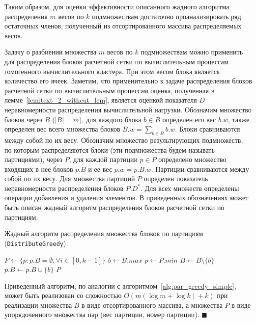 Таким образом, для оценки эффективности описанного жадного алгоритма распределения $m$ весов по $k$ подмножествам достаточно проанализировать ряд остаточных членов, полученный из отсортированного массива распределяемых весов.

Задачу о разбиении множества $m$ весов по $k$ подмножествам можно применить для распределения блоков расчетной сетки по вычислительным процессам гомогенного вычислительного кластера.
При этом весом блока является количество его ячеек.
Заметим, что применительно к задаче распределения блоков расчетной сетки по вычислительным процессам оценка, полученная в лемме~\ref{lem:text_2_withcut_lem}, является оценкой показателя $D$ неравномерности распределения вычислительной нагрузки.
Обозначим множество блоков через $B$ ($|B| = m$), для каждого блока $b \in B$ определен его вес $b.w$, также определен вес всего множества блоков $B.w = \sum_{b \in B}{b.w}$.
Блоки сравниваются между собой по их весу.
Обозначим множество результирующих подмножеств, по которым распределяются блоки (эти подмножества будем называть партициями), через $P$, для каждой партиции $p \in P$ определено множество входящих в нее блоков $p.B$ и ее вес $p.w = p.B.w$.
Партиции сравниваются между собой по их весу.
Для множества партиций $P$ определен показатель неравномерности распределения блоков $P.D^{*}$.
Для всех множеств определены операции добавления и удаления элементов.
В приведенных обозначениях может быть описан жадный алгоритм распределения блоков расчетной сетки по партициям.

\begin{algo}\label{alg:par_distr_greedy}
Жадный алгоритм распределения множества блоков по партициям (\texttt{DistributeGreedy}).
\begin{algorithm}
\DontPrintSemicolon
{}
{
$P \leftarrow \{ p : p.B = \emptyset, \forall i \in [0, k - 1] \}$\;
{
	$b \leftarrow B.max$\;
	$p \leftarrow P.min$\;
	$B \leftarrow B \setminus \{ b \}$\;
	$p.B \leftarrow p.B \cup \{ b \}$\;
}
\KwRet $P$\;
}
\end{algorithm}
\end{algo}

Приведенный алгоритм, по аналогии с алгоритмом~\ref{alg:par_greedy_simple}, может быть реализован со сложностью $O(m(\log m + \log k) + k)$ при реализации множества $B$ в виде отсортированного массива, а множества $P$ в виде упорядоченного множества пар (вес партиции, номер партиции).
$\blacksquare$\\

